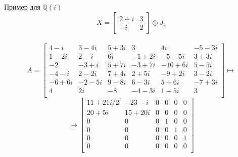 \documentclass[10pt,pdf,hyperref={unicode}]{beamer}
\begin{document}
\begin{frame}{Пример для $\mathbb{Q}(i)$}
    \begin{equation*}
        X = \begin{bmatrix}
            2 + i & 3 \\ -i & 2
        \end{bmatrix} \oplus J_4
    \end{equation*}
    \\
    \begin{equation*}
        A = \begin{bmatrix}
          4 - i &   3 - 4i & 5 + 3i &        3 &        4i & - 5 - 3i\\
  1 - 2i &   2 - i &     6i & - 1 + 2i &  - 5 - 5i &   3 + 3i\\
      -2 & - 3 + i & 5 + 7i & - 3 + 7i & - 10 + 6i &   5 - 5i\\
- 4 - i &   2 - 2i & 7 + 4i &   2 + 5i &  - 9 + 2i &   3 - 2i\\
- 6 + 6i & - 2 - 5i & 9 - 8i &   6 - 3i &    5 + 6i & - 7 + 3i\\
       4 &       2i &     -8 & - 4 - 3i &    1 - 5i &        3\\
        \end{bmatrix} \mapsto  
    \end{equation*}
    \begin{equation*}
        \mapsto
        \left[\begin{array}{cc|cccc}
          11 + 21i/2 & - 23 - i  & 0 & 0 & 0 & 0 \\
          20 + 5i    &  15 + 20i & 0 & 0 & 0 & 0 \\
          \hline
                   0 &         0 & 0 & 1 & 0 & 0 \\
                   0 &         0 & 0 & 0 & 1 & 0 \\
                   0 &         0 & 0 & 0 & 0 & 1 \\
                   0 &         0 & 0 & 0 & 0 & 0 \\  
        \end{array}\right]
    \end{equation*}
\end{frame}
\end{document}
